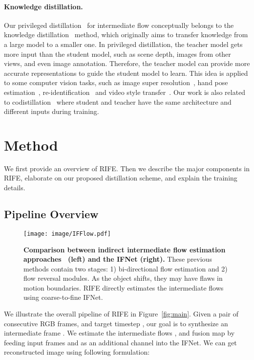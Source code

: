\documentclass[final]{cvpr}
\begin{document}
\paragraph{Knowledge distillation.} Our privileged distillation~\cite{lopez2015unifying} for intermediate flow conceptually belongs to the knowledge distillation~\cite{hinton2015distilling} method, which originally aims to transfer knowledge from a large model to a smaller one. In privileged distillation, the teacher model gets more input than the student model, such as scene depth, images from other views, and even image annotation. Therefore, the teacher model can provide more accurate representations to guide the student model to learn. This idea is applied to some computer vision tasks, such as image super resolution~\cite{lee2020learning}, hand pose estimation~\cite{yuan2018rgb}, re-identification~\cite{porrello2020robust} and video style transfer~\cite{chen2020optical}. Our work is also related to codistillation~\cite{anil2018large} where student and teacher have the same architecture and different inputs during training. 	\section{Method}

We first provide an overview of RIFE. Then we describe the major components in RIFE, elaborate on our proposed distillation scheme, and explain the training details. 

\subsection{Pipeline Overview}
\label{subsec:overview}



\begin{figure}[t]
	\centering
	\texttt{[image: image/IFFlow.pdf]}
	\caption{\textbf{Comparison between indirect intermediate flow estimation approaches~\cite{jiang2018super, xu2019quadratic, bao2019depth, liu2020enhanced} (left) and the IFNet (right).} These previous methods contain two stages: 1) bi-directional flow estimation and 2) flow reversal modules. As the object shifts, they may have flaws in motion boundaries. RIFE directly estimates the intermediate flows using coarse-to-fine IFNet. }\label{fig:IFFlow}
\end{figure}

We illustrate the overall pipeline of RIFE in Figure~\ref{fig:main}. Given a pair of consecutive RGB frames,  and target timestep , our goal is to synthesize an intermediate frame . We estimate the intermediate flows ,  and fusion map  by feeding input frames and  as an additional channel into the IFNet. We can get reconstructed image  using following formulation:
\end{document}
